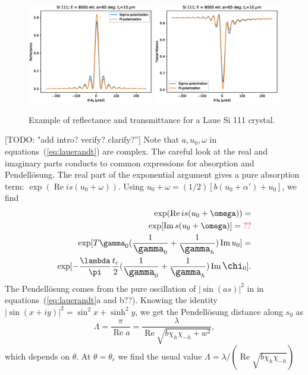 \documentclass[preprint]{iucr}              %
\newcommand{\todo}[1]{{\color{red}[TODO: "#1'']}}
\newcommand{\inblue}[1]{{\color{blue}#1}}
\newcommand{\inred}[1]{{\color{red}#1}}
\begin{document}
\begin{figure}\label{fig:laueProfiles}
    \centering
    \includegraphics[width=0.49\textwidth]{figures/Laue_1.eps}
    \includegraphics[width=0.49\textwidth]{figures/Laue_2.eps}
    \caption{Example of reflectance and transmittance for a Laue Si 111 crystal.}
\end{figure}

\inblue{
\todo{add intro? verify? clarify?} Note that $a, u_0, \omega$ in equations~(\ref{eq:lauerandt}) are complex. The careful look at the real and imaginary parts conducts to common expressions for absorption and Pendell\"osung. The real part of the exponential argument gives a pure absorption term:  
$\exp(\operatorname{Re} i s (u_0+\omega))$. Using $u_0 + \omega = (1/2)[b(u_0+\alpha')+u_0]$, we find
\begin{subequations}
\begin{align}
    \exp(\operatorname{Re} i s (u_0+\omega)) = \nonumber \\
    \exp[\operatorname{Im} s (u_0+\omega)] = \inred{??} \nonumber\\
    \exp[T \gamma_0 \large( \frac{1}{\gamma_0} + \frac{1}{\gamma_h} \large) \operatorname{Im} u_0] = \nonumber \\
    \exp[-\frac{\lambda}{\pi} \frac{t_c}{2} \large( \frac{1}{\gamma_0} + \frac{1}{\gamma_h} \large) \operatorname{Im} \chi_0].
\end{align}
\end{subequations}
The Pendell\"osung comes from the pure oscillation of $|\sin(as)|^2$ \inred{in in equations~(\ref{eq:lauerandt}a and b??)}. Knowing the identity $|\sin(x+iy)|^2=\sin^2x + \sinh^2 y$, we get the Pendell\"osung distance along $s_0$ as 
\begin{equation}
    \Lambda = \frac{\pi}{\operatorname{Re} a}=\frac{\lambda}{\operatorname{Re}\sqrt{b\chi_h\chi_{-h} + w^2}},
\end{equation}
which depends on $\theta$. At $\theta=\theta_c$ we find the usual value $\Lambda=\lambda/(\operatorname{Re}\sqrt{b \chi_h \chi_{-h}})$ 
}
\end{document}
